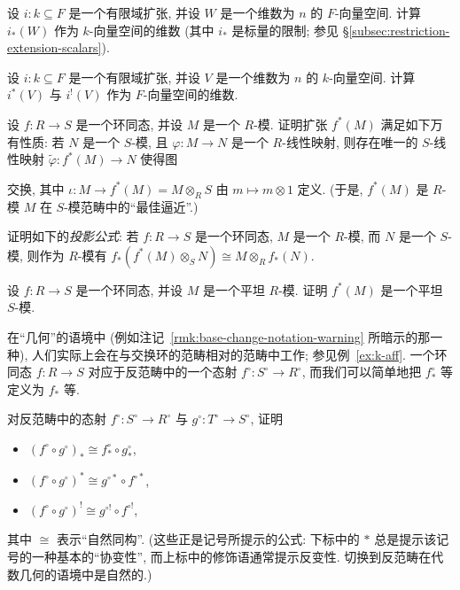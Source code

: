 \begin{prob}\label{ex:restriction-dimension}
设 $i:k\subseteq F$ 是一个有限域扩张, 并设 $W$ 是一个维数为 $n$ 的 $F$-向量空间. 计算 $i_*(W)$ 作为 $k$-向量空间的维数 (其中 $i_*$ 是标量的限制; 参见 \S\ref{subsec:restriction-extension-scalars}).
\end{prob}

\begin{prob}\label{ex:extension-dimension}
设 $i:k\subseteq F$ 是一个有限域扩张, 并设 $V$ 是一个维数为 $n$ 的 $k$-向量空间. 计算 $i^*(V)$ 与 $i^!(V)$ 作为 $F$-向量空间的维数.
\end{prob}

\begin{prob}\label{ex:extension-universal-property}
设 $f:R\to S$ 是一个环同态, 并设 $M$ 是一个 $R$-模. 证明扩张 $f^*(M)$ 满足如下万有性质: 若 $N$ 是一个 $S$-模, 且 $\varphi:M\to N$ 是一个 $R$-线性映射, 则存在唯一的 $S$-线性映射 $\tilde{\varphi}:f^*(M)\to N$ 使得图
\begin{center}
\end{center}
交换, 其中 $\iota:M\to f^*(M)=M\otimes_R S$ 由 $m\mapsto m\otimes 1$ 定义. (于是, $f^*(M)$ 是 $R$-模 $M$ 在 $S$-模范畴中的``最佳逼近''.)
\end{prob}

\begin{prob}\label{ex:projection-formula}
证明如下的\emph{投影公式}: 若 $f:R\to S$ 是一个环同态, $M$ 是一个 $R$-模, 而 $N$ 是一个 $S$-模, 则作为 $R$-模有 $f_*(f^*(M)\otimes_S N)\cong M\otimes_R f_*(N)$.
\end{prob}

\begin{prob}\label{ex:extension-flat}
设 $f:R\to S$ 是一个环同态, 并设 $M$ 是一个平坦 $R$-模. 证明 $f^*(M)$ 是一个平坦 $S$-模.
\end{prob}

\begin{prob}\label{ex:geometric-opposite-base-change}
在``几何''的语境中 (例如注记~\ref{rmk:base-change-notation-warning} 所暗示的那一种), 人们实际上会在与交换环的范畴相对的范畴中工作; 参见例~\ref{ex:k-aff}. 一个环同态 $f:R\to S$ 对应于反范畴中的一个态射 $f^\circ:S^\circ\to R^\circ$, 而我们可以简单地把 $f^\circ_*$ 等定义为 $f_*$ 等.

对反范畴中的态射 $f^\circ:S^\circ\to R^\circ$ 与 $g^\circ:T^\circ\to S^\circ$, 证明
\begin{itemize}
\item $(f^\circ\circ g^\circ)_*\cong f^\circ_*\circ g^\circ_*$,
\item $(f^\circ\circ g^\circ)^*\cong g^{\circ *}\circ f^{\circ *}$,
\item $(f^\circ\circ g^\circ)^!\cong g^{\circ !}\circ f^{\circ !}$,
\end{itemize}
其中 $\cong$ 表示``自然同构''. (这些正是记号所提示的公式: 下标中的 $*$ 总是提示该记号的一种基本的``协变性'', 而上标中的修饰语通常提示反变性. 切换到反范畴在代数几何的语境中是自然的.)
\end{prob}

